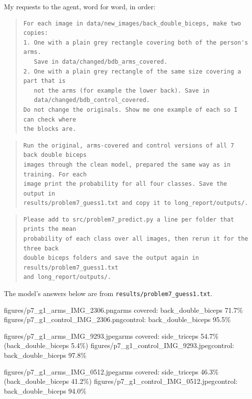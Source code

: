 \documentclass[11pt]{article}
\begin{document}
My requests to the agent, word for word, in order:
\begin{quote}
\begin{Verbatim}[breaklines, fontsize=\small]
For each image in data/new_images/back_double_biceps, make two copies:
1. One with a plain grey rectangle covering both of the person's arms.
   Save in data/changed/bdb_arms_covered.
2. One with a plain grey rectangle of the same size covering a part that is
   not the arms (for example the lower back). Save in
   data/changed/bdb_control_covered.
Do not change the originals. Show me one example of each so I can check where
the blocks are.
\end{Verbatim}
\end{quote}
\begin{quote}
\begin{Verbatim}[breaklines, fontsize=\small]
Run the original, arms-covered and control versions of all 7 back double biceps
images through the clean model, prepared the same way as in training. For each
image print the probability for all four classes. Save the output in
results/problem7_guess1.txt and copy it to long_report/outputs/.
\end{Verbatim}
\end{quote}
\begin{quote}
\begin{Verbatim}[breaklines, fontsize=\small]
Please add to src/problem7_predict.py a line per folder that prints the mean
probability of each class over all images, then rerun it for the three back
double biceps folders and save the output again in results/problem7_guess1.txt
and long_report/outputs/.
\end{Verbatim}
\end{quote}

The model's answers below are from \texttt{results/problem7\_guess1.txt}.

           {figures/p7_g1_arms_IMG_2306.png}{arms covered: back\_double\_biceps 71.7\%}
           {figures/p7_g1_control_IMG_2306.png}{control: back\_double\_biceps 95.5\%}

           {figures/p7_g1_arms_IMG_9293.jpeg}{arms covered: side\_triceps 54.7\% (back\_double\_biceps 5.4\%)}
           {figures/p7_g1_control_IMG_9293.jpeg}{control: back\_double\_biceps 97.8\%}

           {figures/p7_g1_arms_IMG_0512.jpeg}{arms covered: side\_triceps 46.3\% (back\_double\_biceps 41.2\%)}
           {figures/p7_g1_control_IMG_0512.jpeg}{control: back\_double\_biceps 94.0\%}
\end{document}
